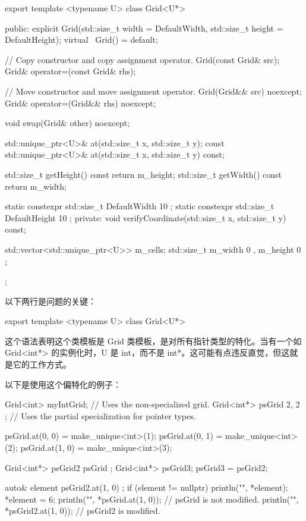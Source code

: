 \begin{cpp}
export template <typename U>
class Grid<U*>
{
    public:
        explicit Grid(std::size_t width = DefaultWidth,
            std::size_t height = DefaultHeight);
        virtual ~Grid() = default;

        // Copy constructor and copy assignment operator.
        Grid(const Grid& src);
        Grid& operator=(const Grid& rhs);

        // Move constructor and move assignment operator.
        Grid(Grid&& src) noexcept;
        Grid& operator=(Grid&& rhs) noexcept;

        void swap(Grid& other) noexcept;

        std::unique_ptr<U>& at(std::size_t x, std::size_t y);
        const std::unique_ptr<U>& at(std::size_t x, std::size_t y) const;

        std::size_t getHeight() const { return m_height; }
        std::size_t getWidth() const { return m_width; }

        static constexpr std::size_t DefaultWidth { 10 };
        static constexpr std::size_t DefaultHeight { 10 };
    private:
        void verifyCoordinate(std::size_t x, std::size_t y) const;

        std::vector<std::unique_ptr<U>> m_cells;
        std::size_t m_width { 0 }, m_height { 0 };
};
\end{cpp}

以下两行是问题的关键：

\begin{cpp}
export template <typename U>
class Grid<U*>
\end{cpp}

这个语法表明这个类模板是 Grid 类模板，是对所有指针类型的特化。当有一个如 Grid<int*> 的实例化时，U 是 int，而不是 int*。这可能有点违反直觉，但这就是它的工作方式。

以下是使用这个偏特化的例子：

\begin{cpp}
Grid<int> myIntGrid; // Uses the non-specialized grid.
Grid<int*> psGrid { 2, 2 }; // Uses the partial specialization for pointer types.

psGrid.at(0, 0) = make_unique<int>(1);
psGrid.at(0, 1) = make_unique<int>(2);
psGrid.at(1, 0) = make_unique<int>(3);

Grid<int*> psGrid2 { psGrid };
Grid<int*> psGrid3;
psGrid3 = psGrid2;

auto& element { psGrid2.at(1, 0) };
if (element != nullptr) {
    println("{}", *element);
    *element = 6;
}
println("{}", *psGrid.at(1, 0)); // psGrid is not modified.
println("{}", *psGrid2.at(1, 0)); // psGrid2 is modified.
\end{cpp}

